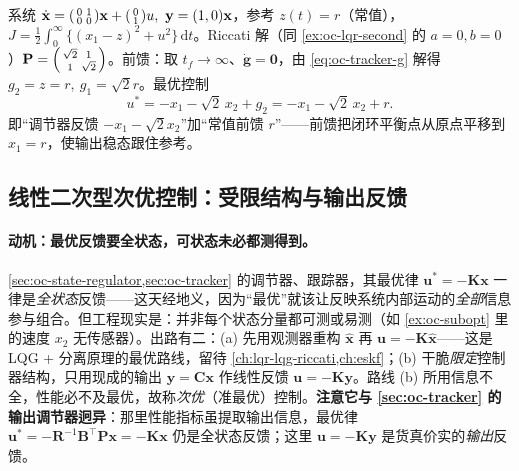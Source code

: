 \begin{example}\label{ex:oc-tracker-const}
系统 $\dot{\mathbf x}=\begin{psmallmatrix}0&1\\0&0\end{psmallmatrix}\mathbf x+\begin{psmallmatrix}0\\1\end{psmallmatrix}u,\ \mathbf y=(1,0)\mathbf x$，参考 $z(t)=r$（常值），$J=\tfrac12\int_0^\infty\{(x_1-z)^2+u^2\}\,\mathrm dt$。Riccati 解（同 \cref{ex:oc-lqr-second} 的 $a=0,b=0$）$\mathbf P=\begin{psmallmatrix}\sqrt2&1\\1&\sqrt2\end{psmallmatrix}$。前馈：取 $t_f\to\infty$、$\dot{\mathbf g}=\mathbf0$，由 \cref{eq:oc-tracker-g} 解得 $g_2=z=r,\ g_1=\sqrt2 r$。最优控制
\begin{equation}
  u^*=-x_1-\sqrt2\,x_2+g_2=-x_1-\sqrt2\,x_2+r.
  \label{eq:oc-tracker-const-u}
\end{equation}
即“调节器反馈 $-x_1-\sqrt2x_2$”加“常值前馈 $r$”——前馈把闭环平衡点从原点平移到 $x_1=r$，使输出稳态跟住参考。
\end{example}

\subsection{线性二次型次优控制：受限结构与输出反馈}
\label{sec:oc-lq-suboptimal}

\paragraph{动机：最优反馈要全状态，可状态未必都测得到。}
\cref{sec:oc-state-regulator,sec:oc-tracker} 的调节器、跟踪器，其最优律 $\mathbf u^*=-\mathbf K\mathbf x$ 一律是\emph{全状态}反馈——这天经地义，因为“最优”就该让反映系统内部运动的\emph{全部}信息参与组合\cite{liubao2006modern}。但工程现实是：并非每个状态分量都可测或易测（如 \cref{ex:oc-subopt} 里的速度 $x_2$ 无传感器）。出路有二：(a) 先用观测器重构 $\hat{\mathbf x}$ 再 $\mathbf u=-\mathbf K\hat{\mathbf x}$——这是 LQG + 分离原理的最优路线，留待 \cref{ch:lqr-lqg-riccati,ch:eskf}；(b) 干脆\emph{限定}控制器结构，只用现成的输出 $\mathbf y=\mathbf C\mathbf x$ 作线性反馈 $\mathbf u=-\mathbf K\mathbf y$。路线 (b) 所用信息不全，性能必不及最优，故称\emph{次优}（准最优）控制。\textbf{注意它与 \cref{sec:oc-tracker} 的输出调节器迥异}：那里性能指标虽提取输出信息，最优律 $\mathbf u^*=-\mathbf R^{-1}\mathbf B^\top\mathbf P\mathbf x=-\mathbf K\mathbf x$ 仍是全状态反馈；这里 $\mathbf u=-\mathbf K\mathbf y$ 是货真价实的\emph{输出}反馈。

